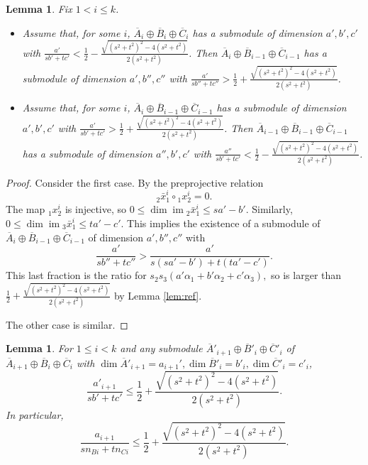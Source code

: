 \documentclass{amsart}
\numberwithin{equation}{section}
\numberwithin{figure}{section}
\numberwithin{table}{section}
\newtheorem{Lemma}[equation]{Lemma}
\theoremstyle{definition}
\newcommand{\im}{\operatorname{im}}
\begin{document}
\begin{Lemma} \label{lem:sub-quotient} 
Fix $1< i \leq k$. 
\begin{itemize}
\item Assume that, for some $i$, $\overline A_i \oplus \overline B_i \oplus \overline C_i$ has a submodule of dimension $a',b',c'$ with $\frac{a'}{sb'+tc'}<  \frac{1}{2}-\frac{\sqrt{(s^2+t^2)^2-4(s^2+t^2)}}{2(s^2+t^2)}$. Then $\overline A_i \oplus \overline B_{i-1} \oplus \overline C_{i-1}$ has a submodule of dimension $a', b'',c''$ with $\frac{a'}{sb''+tc''}>  \frac{1}{2}+\frac{\sqrt{(s^2+t^2)^2-4(s^2+t^2)}}{2(s^2+t^2)}$.

\item  Assume that, for some $i$, $\overline A_i \oplus \overline B_{i-1} \oplus \overline C_{i-1}$ has a submodule of dimension $a',b',c'$ with $\frac{a'}{sb'+tc'}> \frac{1}{2}+\frac{\sqrt{(s^2+t^2)^2-4(s^2+t^2)}}{2(s^2+t^2)}$. Then $\overline A_{i-1} \oplus \overline B_{i-1} \oplus \overline C_{i-1}$ has a submodule of dimension $a'', b',c'$ with $\frac{a''}{sb'+tc'}<  \frac{1}{2}-\frac{\sqrt{(s^2+t^2)^2-4(s^2+t^2)}}{2(s^2+t^2)}$.
\end{itemize}
\end{Lemma}

\begin{proof}
Consider the first case.  By the preprojective relation
$$ {}_2 \bar x^i_1 \circ {}_1 x^i_2 =0.$$
The map $ {}_1 x^i_2 $ is injective, so $0 \leq \dim \im  {}_2 \bar x^i_1 \leq sa'-b'$.
Similarly, $0 \leq \dim \im  {}_3 \bar x^i_1 \leq ta'-c'$. This implies the existence of a submodule of  $\overline A_i \oplus \overline B_{i-1} \oplus \overline C_{i-1}$ of dimension $a',b'',c''$ with 
$$\frac{a'}{sb''+tc''}>\frac{a'}{s(sa'-b')+t(ta'-c')}.$$
This last fraction is the ratio for $s_2s_3 (a'\alpha_1+b'\alpha_2+c'\alpha_3),$ so is larger than 
$\frac{1}{2}+\frac{\sqrt{(s^2+t^2)^2-4(s^2+t^2)}}{2(s^2+t^2)}$ by Lemma \ref{lem:ref}.

The other case is similar. 
\end{proof}

\begin{Lemma} \label{lem:mainr}
For $1 \leq i <k$ and any submodule $\overline A'_{i+1} \oplus \overline B'_i\oplus \overline C'_i$ of  $ \overline A_{i+1} \oplus \overline B_i\oplus  \overline C_i $ with $\dim \overline A'_{i+1}=a_{i+1}', \dim \overline B'_i =b'_i, \dim  \overline C'_i =c'_i$, 
\begin{equation} \label{eq:sm} \frac{a'_{i+1}}{sb'+tc'} \leq \frac{1}{2}+\frac{\sqrt{(s^2+t^2)^2-4(s^2+t^2)}}{2(s^2+t^2)}.
\end{equation}
In particular, 
\begin{equation} \label{eq:sth}
\frac{a_{i+1}}{sn_{Bi}+tn_{Ci}} \leq \frac{1}{2}+\frac{\sqrt{(s^2+t^2)^2-4(s^2+t^2)}}{2(s^2+t^2)}.
\end{equation}
\end{Lemma}
\end{document}
